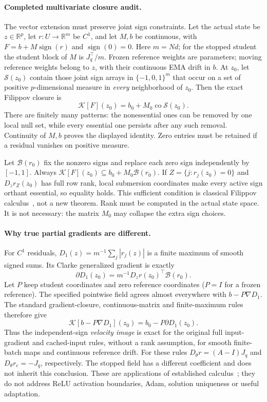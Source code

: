 \documentclass[11pt,a4paper]{article}
\newcommand{\R}{\mathbb{R}}
\begin{document}
\paragraph{Completed multivariate closure audit.}
The vector extension must preserve joint sign constraints. Let the actual
state be $z\in\R^p$, let $r:U\to\R^m$ be $C^1$, and let $M,b$ be
continuous, with $F=b+M\operatorname{sign}(r)$ and
$\operatorname{sign}(0)=0$. Here $m=Nd$; for the stopped student the
student block of $M$ is $J_q^\top/m$. Frozen reference weights are
parameters; moving reference weights belong to $z$, with their continuous
EMA drift in $b$. At $z_0$, let $\mathcal S(z_0)$ contain those joint
sign arrays in $\{-1,0,1\}^m$ that occur on a set of positive
$p$-dimensional measure in \emph{every} neighborhood of $z_0$. Then
the exact Filippov closure is
\[
 \mathcal K[F](z_0)=b_0+M_0\operatorname{co}\mathcal S(z_0).
\]
There are finitely many patterns: the nonessential ones can be removed
by one local null set, while every essential one persists after any such
removal. Continuity of $M,b$ proves the displayed identity. Zero entries
must be retained if a residual vanishes on positive measure.

Let $\mathcal B(r_0)$ fix the nonzero signs and replace each zero sign
independently by $[-1,1]$. Always
$\mathcal K[F](z_0)\subseteq b_0+M_0\mathcal B(r_0)$.
If $Z=\{j:r_j(z_0)=0\}$ and $D_zr_Z(z_0)$ has full row rank, local
submersion coordinates make every active sign orthant essential, so
equality holds. This sufficient condition is classical
Filippov calculus~\cite{padensastry,cortes}, not a new theorem.
Rank must be computed in the actual state space. It is not necessary:
the matrix $M_0$ may collapse the extra sign choices.

\paragraph{Why true partial gradients are different.}
For $C^1$ residuals, $D_1(z)=m^{-1}\sum_j|r_j(z)|$ is a finite maximum
of smooth signed sums. Its Clarke generalized gradient is exactly
\[
 \partial D_1(z_0)=m^{-1}D_zr(z_0)^\top\mathcal B(r_0).
\]
Let $P$ keep student coordinates and zero reference coordinates
($P=I$ for a frozen reference). The specified pointwise field agrees
almost everywhere with $b-P\nabla D_1$. The standard gradient-closure,
continuous-matrix and finite-maximum rules therefore give
\[
 \mathcal K[b-P\nabla D_1](z_0)=b_0-P\partial D_1(z_0).
\]
Thus the independent-sign \emph{velocity image} is exact for the original
full input-gradient and cached-input rules, without a rank assumption,
for smooth finite-batch maps and continuous reference drift.
For these rules $D_\theta r=(A-I)J_q$ and
$D_\theta r_c=-J_q$, respectively. The stopped field has a different
coefficient and does not inherit this conclusion. These are applications
of established calculus~\cite{padensastry,cortes}; they do not address
ReLU activation boundaries, Adam, solution uniqueness or useful adaptation.
\end{document}
